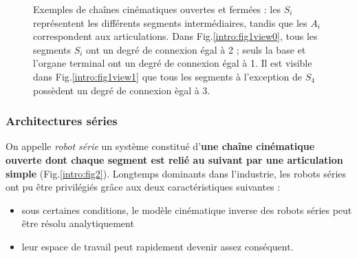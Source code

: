 \begin{figure}[!ht]
  \centering
       \hfill
    \caption{\footnotesize{Exemples de cha\^ines cinématiques ouvertes et fermées : les $S_i$ représentent les différents segments intermédiaires, tandis que les $A_i$ correspondent aux articulations. Dans Fig.\ref{intro:fig1view0}, tous les segments $S_i$ ont un degré de connexion égal à 2 ; seuls la base et l'organe terminal ont un degré de connexion égal à 1. Il est visible dans Fig.\ref{intro:fig1view1} que tous les segments à l'exception de $S_4$ possèdent un degré de connexion ègal à 3.}}
\label{intro:fig1}
\end{figure}

\subsubsection{Architectures séries}

On appelle {\it robot série} un système constitué d'{\bf une chaîne cinématique ouverte dont chaque segment est relié au suivant par une articulation simple} (Fig.\ref{intro:fig2}). Longtemps dominants dans l'industrie, les robots séries ont pu être privilégiés grâce aux deux caractéristiques suivantes :
\begin{itemize}
 \item sous certaines conditions, le modèle cinématique inverse des robots séries peut être résolu analytiquement \cite{pieper1968kinematics}
 \item leur espace de travail peut rapidement devenir assez conséquent.
\end{itemize}

